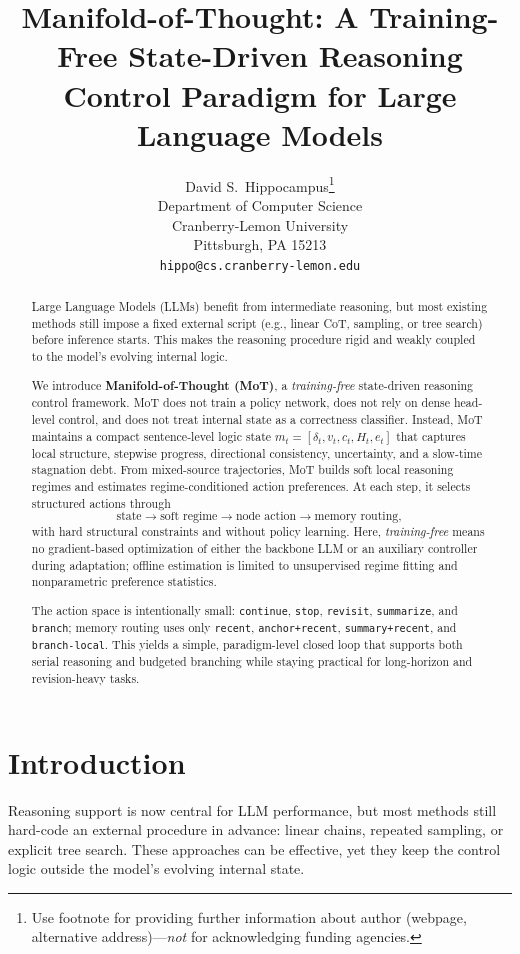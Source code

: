 \documentclass{article}
\title{Manifold-of-Thought: A Training-Free State-Driven Reasoning Control Paradigm for Large Language Models}
\author{%
  David S.~Hippocampus\thanks{Use footnote for providing further information
    about author (webpage, alternative address)---\emph{not} for acknowledging
    funding agencies.} \\
  Department of Computer Science\\
  Cranberry-Lemon University\\
  Pittsburgh, PA 15213 \\
  \texttt{hippo@cs.cranberry-lemon.edu} \\
}
\begin{document}
\maketitle

\begin{abstract}
Large Language Models (LLMs) benefit from intermediate reasoning, but most existing methods still impose a fixed external script (e.g., linear CoT, sampling, or tree search) before inference starts. This makes the reasoning procedure rigid and weakly coupled to the model's evolving internal logic.

We introduce \textbf{Manifold-of-Thought (MoT)}, a \emph{training-free} state-driven reasoning control framework. MoT does not train a policy network, does not rely on dense head-level control, and does not treat internal state as a correctness classifier. Instead, MoT maintains a compact sentence-level logic state
$m_t=[\delta_t, v_t, c_t, H_t, e_t]$ that captures local structure, stepwise progress, directional consistency, uncertainty, and a slow-time stagnation debt. From mixed-source trajectories, MoT builds soft local reasoning regimes and estimates regime-conditioned action preferences. At each step, it selects structured actions through
\[
\text{state} \rightarrow \text{soft regime} \rightarrow \text{node action} \rightarrow \text{memory routing},
\]
with hard structural constraints and without policy learning. Here, \emph{training-free} means no gradient-based optimization of either the backbone LLM or an auxiliary controller during adaptation; offline estimation is limited to unsupervised regime fitting and nonparametric preference statistics.

The action space is intentionally small: \texttt{continue}, \texttt{stop}, \texttt{revisit}, \texttt{summarize}, and \texttt{branch}; memory routing uses only \texttt{recent}, \texttt{anchor+recent}, \texttt{summary+recent}, and \texttt{branch-local}. This yields a simple, paradigm-level closed loop that supports both serial reasoning and budgeted branching while staying practical for long-horizon and revision-heavy tasks.
\end{abstract}


\section{Introduction}
\label{sec:intro}

Reasoning support is now central for LLM performance, but most methods still hard-code an external procedure in advance: linear chains, repeated sampling, or explicit tree search. These approaches can be effective, yet they keep the control logic outside the model's evolving internal state.
\end{document}

